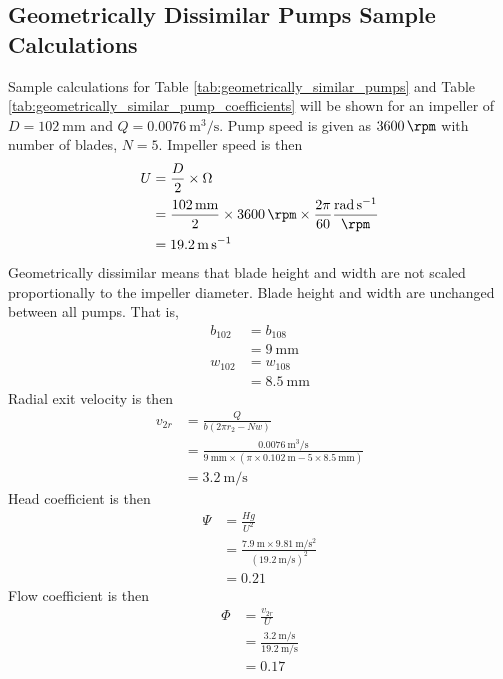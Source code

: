 \subsection{Geometrically Dissimilar Pumps Sample Calculations}
Sample calculations for Table \ref{tab:geometrically_similar_pumps} and Table \ref{tab:geometrically_similar_pump_coefficients} will be shown for an impeller of $D = \qty{102}{\milli\meter}$ and $Q = \qty{0.0076}{\meter\cubed\per\second}$. Pump speed is given as $\qty{3600}{\rpm}$ with number of blades, $N = 5$. Impeller speed is then
\begin{align*}
    U &= \frac{D}{2} \times \Omega \\
    &= \frac{\qty{102}{\milli\meter}}{2} \times \qty{3600}{\rpm} \times \frac{2\pi}{60} \frac{\unit{\radian\per\second}}{\unit{\rpm}} \\
    &= \qty{19.2}{\meter\per\second}
\end{align*}
Geometrically dissimilar means that blade height and width are not scaled proportionally to the impeller diameter. Blade height and width are unchanged between all pumps. That is,
\begin{align*}
    b_{102} &= b_{108}  \\
    &= \qty{9}{\milli\meter} \\
    w_{102} &= w_{108}  \\
    &= \qty{8.5}{\milli\meter}
\end{align*}
Radial exit velocity is then
\begin{align*}
    v_{2r} &= \frac{Q}{b(2\pi r_2 - Nw)} \\
    &= \frac{\qty{0.0076}{\meter\cubed\per\second}}{\qty{9}{\milli\meter} \times (\pi \times \qty{0.102}{\meter} - 5 \times \qty{8.5}{\milli\meter})} \\
    &= \qty{3.2}{\meter\per\second}
\end{align*}
Head coefficient is then
\begin{align*}
    \Psi &= \frac{Hg}{U^2} \\
    &= \frac{\qty{7.9}{\meter} \times \qty{9.81}{\meter\per\second\squared}}{(\qty{19.2}{\meter\per\second})^2} \\
    &= 0.21
\end{align*}
Flow coefficient is then
\begin{align*}
    \Phi &= \frac{v_{2r}}{U} \\
    &= \frac{\qty{3.2}{\meter\per\second}}{\qty{19.2}{\meter\per\second}} \\
    &= 0.17
\end{align*}